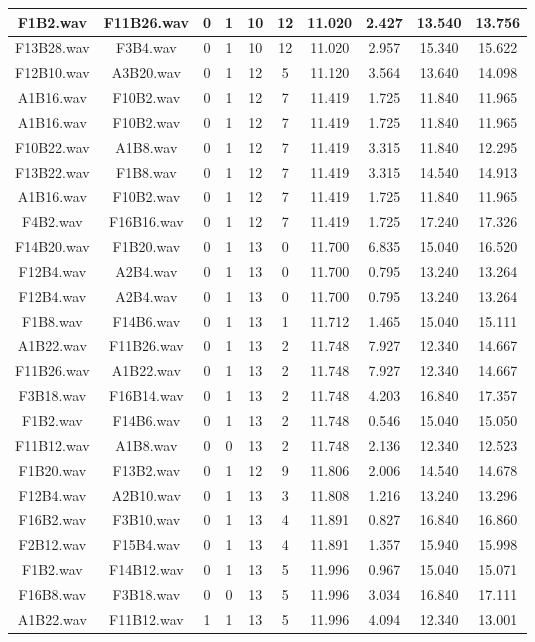 \documentclass[11pt,a4paper]{book}
\begin{document}
\begin{longtable}[c]{|c|c|c|c|c|c|c|c|c|c|}
F1B2.wav&F11B26.wav&0&1&10&12&11.020&2.427&13.540&13.756\\ \hline
F13B28.wav&F3B4.wav&0&1&10&12&11.020&2.957&15.340&15.622\\ \hline
F12B10.wav&A3B20.wav&0&1&12&5&11.120&3.564&13.640&14.098\\ \hline
A1B16.wav&F10B2.wav&0&1&12&7&11.419&1.725&11.840&11.965\\ \hline
A1B16.wav&F10B2.wav&0&1&12&7&11.419&1.725&11.840&11.965\\ \hline
F10B22.wav&A1B8.wav&0&1&12&7&11.419&3.315&11.840&12.295\\ \hline
F13B22.wav&F1B8.wav&0&1&12&7&11.419&3.315&14.540&14.913\\ \hline
A1B16.wav&F10B2.wav&0&1&12&7&11.419&1.725&11.840&11.965\\ \hline
F4B2.wav&F16B16.wav&0&1&12&7&11.419&1.725&17.240&17.326\\ \hline
F14B20.wav&F1B20.wav&0&1&13&0&11.700&6.835&15.040&16.520\\ \hline
F12B4.wav&A2B4.wav&0&1&13&0&11.700&0.795&13.240&13.264\\ \hline
F12B4.wav&A2B4.wav&0&1&13&0&11.700&0.795&13.240&13.264\\ \hline
F1B8.wav&F14B6.wav&0&1&13&1&11.712&1.465&15.040&15.111\\ \hline
A1B22.wav&F11B26.wav&0&1&13&2&11.748&7.927&12.340&14.667\\ \hline
F11B26.wav&A1B22.wav&0&1&13&2&11.748&7.927&12.340&14.667\\ \hline
F3B18.wav&F16B14.wav&0&1&13&2&11.748&4.203&16.840&17.357\\ \hline
F1B2.wav&F14B6.wav&0&1&13&2&11.748&0.546&15.040&15.050\\ \hline
F11B12.wav&A1B8.wav&0&0&13&2&11.748&2.136&12.340&12.523\\ \hline
F1B20.wav&F13B2.wav&0&1&12&9&11.806&2.006&14.540&14.678\\ \hline
F12B4.wav&A2B10.wav&0&1&13&3&11.808&1.216&13.240&13.296\\ \hline
F16B2.wav&F3B10.wav&0&1&13&4&11.891&0.827&16.840&16.860\\ \hline
F2B12.wav&F15B4.wav&0&1&13&4&11.891&1.357&15.940&15.998\\ \hline
F1B2.wav&F14B12.wav&0&1&13&5&11.996&0.967&15.040&15.071\\ \hline
F16B8.wav&F3B18.wav&0&0&13&5&11.996&3.034&16.840&17.111\\ \hline
A1B22.wav&F11B12.wav&1&1&13&5&11.996&4.094&12.340&13.001\\ \hline

\end{longtable}
\end{document}
